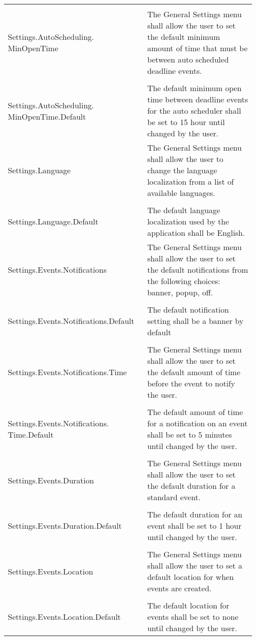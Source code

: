 \documentclass{scrreprt}
\begin{document}
\begin{center}
\begin{longtable}{ | p{6cm} | p{9cm} | }
& \\
Settings.AutoScheduling. MinOpenTime & The General Settings menu shall allow the user to set the default minimum amount of time that must be between auto scheduled deadline events. \\
& \\
Settings.AutoScheduling. MinOpenTime.Default & The default minimum open time between deadline events for the auto scheduler shall be set to 15 hour until changed by the user. \\
\hline
Settings.Language & The General Settings menu shall allow the user to change the language localization from a list of available languages. \\
& \\
Settings.Language.Default & The default language localization used by the application shall be English. \\
\hline
Settings.Events.Notifications & The General Settings menu shall allow the user to set the default notifications from the following choices: banner, popup, off. \\
& \\
Settings.Events.Notifications.Default & The default notification setting shall be a banner by default \\
& \\
Settings.Events.Notifications.Time & The General Settings menu shall allow the user to set the default amount of time before the event to notify the user. \\
& \\
Settings.Events.Notifications. Time.Default & The default amount of time for a notification on an event shall be set to 5 minutes until changed by the user. \\
& \\
Settings.Events.Duration & The General Settings menu shall allow the user to set the default duration for a standard event. \\
& \\
Settings.Events.Duration.Default & The default duration for an event shall be set to 1 hour until changed by the user. \\
& \\
Settings.Events.Location & The General Settings menu shall allow the user to set a default location for when events are created. \\
& \\
Settings.Events.Location.Default & The default location for events shall be set to none until changed by the user. \\

\end{longtable}
\end{center}
\end{document}
